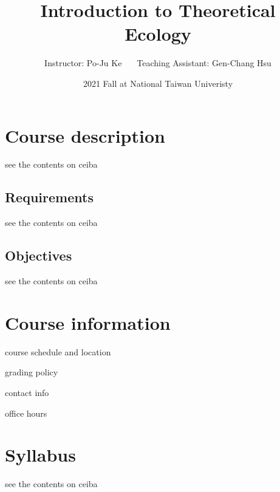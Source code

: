 \documentclass[
]{book}
\title{Introduction to Theoretical Ecology}
\author{Instructor: Po-Ju Ke \(~~~~~\) Teaching Assistant: Gen-Chang Hsu}
\date{2021 Fall at National Taiwan Univeristy}
\begin{document}
\maketitle

{
\setcounter{tocdepth}{1}
\tableofcontents
}
\hypertarget{course-description}{%
\chapter*{Course description}\label{course-description}}

see the contents on ceiba

\hypertarget{requirements}{%
\section*{Requirements}\label{requirements}}

see the contents on ceiba

\hypertarget{objectives}{%
\section*{Objectives}\label{objectives}}

see the contents on ceiba

\hypertarget{course-information}{%
\chapter*{Course information}\label{course-information}}

course schedule and location

grading policy

contact info

office hours

\hypertarget{syllabus}{%
\chapter*{Syllabus}\label{syllabus}}

see the contents on ceiba

\begingroup\fontsize{20}{22}\selectfont
\end{document}
